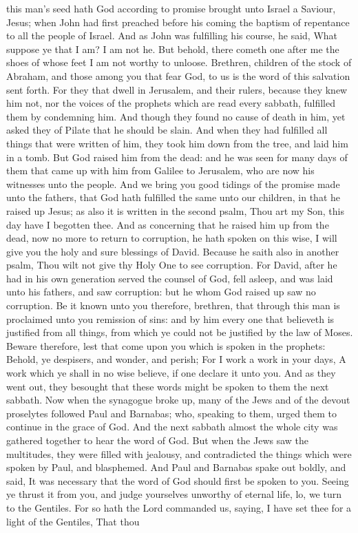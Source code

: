 this man’s seed hath God according to promise brought unto Israel a Saviour, Jesus; when John had first preached before his coming the baptism of repentance to all the people of Israel. And as John was fulfilling his course, he said, What suppose ye that I am? I am not he. But behold, there cometh one after me the shoes of whose feet I am not worthy to unloose. Brethren, children of the stock of Abraham, and those among you that fear God, to us is the word of this salvation sent forth. For they that dwell in Jerusalem, and their rulers, because they knew him not, nor the voices of the prophets which are read every sabbath, fulfilled them by condemning him. And though they found no cause of death in him, yet asked they of Pilate that he should be slain. And when they had fulfilled all things that were written of him, they took him down from the tree, and laid him in a tomb. But God raised him from the dead: and he was seen for many days of them that came up with him from Galilee to Jerusalem, who are now his witnesses unto the people. And we bring you good tidings of the promise made unto the fathers, that God hath fulfilled the same unto our children, in that he raised up Jesus; as also it is written in the second psalm, Thou art my Son, this day have I begotten thee. And as concerning that he raised him up from the dead, now no more to return to corruption, he hath spoken on this wise, I will give you the holy and sure blessings of David. Because he saith also in another psalm, Thou wilt not give thy Holy One to see corruption. For David, after he had in his own generation served the counsel of God, fell asleep, and was laid unto his fathers, and saw corruption: but he whom God raised up saw no corruption. Be it known unto you therefore, brethren, that through this man is proclaimed unto you remission of sins: and by him every one that believeth is justified from all things, from which ye could not be justified by the law of Moses. Beware therefore, lest that come upon you which is spoken in the prophets:  Behold, ye despisers, and wonder, and perish; For I work a work in your days, A work which ye shall in no wise believe, if one declare it unto you.  And as they went out, they besought that these words might be spoken to them the next sabbath. Now when the synagogue broke up, many of the Jews and of the devout proselytes followed Paul and Barnabas; who, speaking to them, urged them to continue in the grace of God.  And the next sabbath almost the whole city was gathered together to hear the word of God. But when the Jews saw the multitudes, they were filled with jealousy, and contradicted the things which were spoken by Paul, and blasphemed. And Paul and Barnabas spake out boldly, and said, It was necessary that the word of God should first be spoken to you. Seeing ye thrust it from you, and judge yourselves unworthy of eternal life, lo, we turn to the Gentiles. For so hath the Lord commanded us, saying, I have set thee for a light of the Gentiles, That thou 